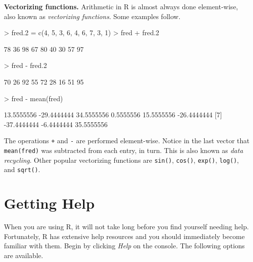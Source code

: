 \documentclass[english]{article}
\renewenvironment{Schunk}{\vspace{\topsep}}{\vspace{\topsep}}
\begin{document}
\textbf{Vectorizing functions.} Arithmetic in \textsf{R} is almost
always done element-wise, also known as \emph{vectorizing functions}.
Some examples follow.

\begin{Schunk}
\begin{Sinput}
> fred.2 = c(4, 5, 3, 6, 4, 6, 7, 3, 1)
> fred + fred.2
\end{Sinput}
\begin{Soutput}
[1] 78 36 98 67 80 40 30 57 97
\end{Soutput}
\begin{Sinput}
> fred - fred.2
\end{Sinput}
\begin{Soutput}
[1] 70 26 92 55 72 28 16 51 95
\end{Soutput}
\begin{Sinput}
> fred - mean(fred)
\end{Sinput}
\begin{Soutput}
[1]  13.5555556 -29.4444444  34.5555556   0.5555556  15.5555556 -26.4444444
[7] -37.4444444  -6.4444444  35.5555556
\end{Soutput}
\end{Schunk}


The operations \texttt{+} and \texttt{-} are performed element-wise.
Notice in the last vector that \texttt{mean(fred)} was subtracted
from each entry, in turn. This is also known as \emph{data recycling}.
Other popular vectorizing functions are \texttt{sin()}, \texttt{cos()},
\texttt{exp()}, \texttt{log()}, and \texttt{sqrt()}.


\section{Getting Help}

When you are using \textsf{R}, it will not take long before you find
yourself needing help. Fortunately, \textsf{R} has extensive help
resources and you should immediately become familiar with them. Begin
by clicking \emph{Help} on the console. The following options are
available.
\end{document}
